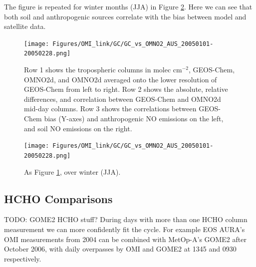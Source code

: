     The figure is repeated for winter months (JJA) in Figure \ref{Model:Analysis:NOx:fig_GC_vs_OMNO2d_AUS_Winter_2005}.
    Here we can see that both soil and anthropogenic sources correlate with the bias between model and satellite data.
    
    \begin{figure}
      \texttt{[image: Figures/OMI\_link/GC/GC\_vs\_OMNO2\_AUS\_20050101-20050228.png]}
      \caption{%
        Row 1 shows the tropospheric columns in molec cm$^{-2}$, GEOS-Chem, OMNO2d, and OMNO2d averaged onto the lower resolution of GEOS-Chem from left to right.
        Row 2 shows the absolute, relative differences, and correlation between GEOS-Chem and OMNO2d mid-day columns.
        Row 3 shows the correlations between GEOS-Chem bias (Y-axes) and anthropogenic NO emissions on the left, and soil NO emissions on the right.
      }
      \label{Model:Analysis:NOx:fig_GC_vs_OMNO2d_AUS_Summer_2005}
    \end{figure}
    
    \begin{figure}
      \texttt{[image: Figures/OMI\_link/GC/GC\_vs\_OMNO2\_AUS\_20050101-20050228.png]}
      \caption{%
        As Figure \ref{Model:Analysis:NOx:fig_GC_vs_OMNO2d_AUS_Summer_2005}, over winter (JJA).
      }
      \label{Model:Analysis:NOx:fig_GC_vs_OMNO2d_AUS_Winter_2005}
    \end{figure}
    
  \subsection{HCHO Comparisons}
    TODO: GOME2 HCHO stuff?
    During days with more than one HCHO column measurement we can more confidently fit the cycle. 
    For example EOS AURA's OMI measurements from 2004 can be combined with MetOp-A's GOME2 after October 2006, with daily overpasses by OMI and GOME2 at 1345 and 0930 respectively.